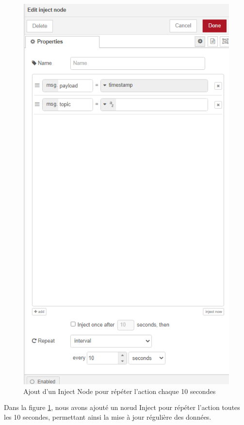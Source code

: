 \begin{figure}[H]
\centering
\includegraphics[width=12cm]{Images/Node-8.png}
\caption{Ajout d'un Inject Node pour répéter l'action chaque 10 secondes}
\label{Chap4.3.15}
\end{figure}

Dans la figure \ref{Chap4.3.15}, nous avons ajouté un nœud Inject pour répéter l'action toutes les 10 secondes, permettant ainsi la mise à jour régulière des données.


